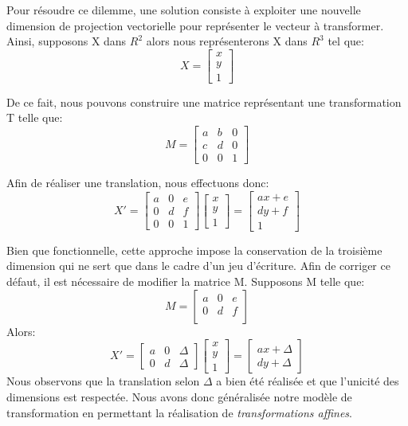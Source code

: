 \noindent Pour résoudre ce dilemme, une solution consiste à exploiter une nouvelle dimension de projection vectorielle pour représenter le vecteur à transformer. Ainsi, supposons X dans $R^2$ alors nous représenterons X dans $R^3$ tel que:
$$X=\begin{bmatrix}
x \\
y\\
1
\end{bmatrix}$$

\noindent De ce fait, nous pouvons construire une matrice représentant une transformation T telle que:
$$M=
\begin{bmatrix}
  a & b & 0 \\
  c & d & 0 \\
  0 & 0 & 1
\end{bmatrix}$$

\noindent Afin de réaliser une translation, nous effectuons donc:
$$X'=
\begin{bmatrix}
  a & 0 & e \\
  0 & d & f \\
  0 & 0 & 1
\end{bmatrix}\begin{bmatrix}
x \\
y\\
1
\end{bmatrix}=\begin{bmatrix}
ax+e \\
dy+f\\
1
\end{bmatrix}$$

\noindent Bien que fonctionnelle, cette approche impose la conservation de la troisième dimension qui ne sert que dans le cadre d'un jeu d'écriture. Afin de corriger ce défaut, il est nécessaire de modifier la matrice M. Supposons M telle que:
$$M=
\begin{bmatrix}
  a & 0 & e \\
  0 & d & f \\
\end{bmatrix}$$
\noindent Alors:
$$
X' =  \begin{bmatrix}
a & 0 & \Delta \\
0 & d & \Delta
\end{bmatrix}
%
\begin{bmatrix}
x \\
y \\
1
\end{bmatrix} =
\begin{bmatrix}
ax + \Delta \\
dy + \Delta
\end{bmatrix} $$
\noindent Nous observons que la translation selon $\Delta$ a bien été réalisée et que l'unicité des dimensions est respectée. Nous avons donc généralisée notre modèle de transformation en permettant la réalisation de \textit{transformations affines}.

